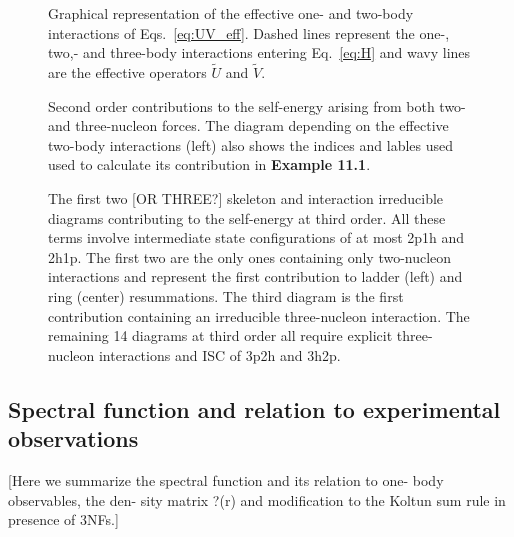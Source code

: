 \begin{figure}[ht]
\begin{center}
\caption{Graphical representation of the effective one- and two-body interactions of Eqs.~\ref{eq:UV_eff}. Dashed lines represent the
one-, two,- and three-body interactions entering Eq.~\eqref{eq:H} and wavy lines are the effective operators $\tilde U$ and  $\tilde V$.}
\label{fig:EffOps}
\end{center}
\end{figure}

\begin{figure}[ht]
\begin{center}
\caption{Second order contributions to the self-energy arising from both two- and three-nucleon forces. The diagram depending on the effective two-body interactions (left) also shows the indices and lables used used to calculate its contribution in {\bf Example 11.1}. }
\label{fig:2ndOrd}
\end{center}
\end{figure}

\begin{figure}[ht]
\begin{center}
\caption{The first two [OR THREE?] skeleton and interaction irreducible diagrams contributing to the self-energy at third order.  All these terms involve intermediate state configurations of at most 2p1h and 2h1p. The first two  
are the only ones containing only two-nucleon interactions and represent the first contribution to ladder (left) and ring (center) resummations. The 
third diagram is the first contribution containing an irreducible three-nucleon interaction. The remaining 14 diagrams at third order all require
explicit three-nucleon interactions and ISC of 3p2h and 3h2p.  }
\label{fig:3rdOrd}
\end{center}
\end{figure}


\subsection{Spectral function and relation to  experimental observations}
\label{sec:scgf_obs}

{\color{blue}
[Here we summarize the spectral function and its relation to one- body observables, the den- sity matrix ?(r) and modification to the Koltun sum rule in presence of 3NFs.]
}


